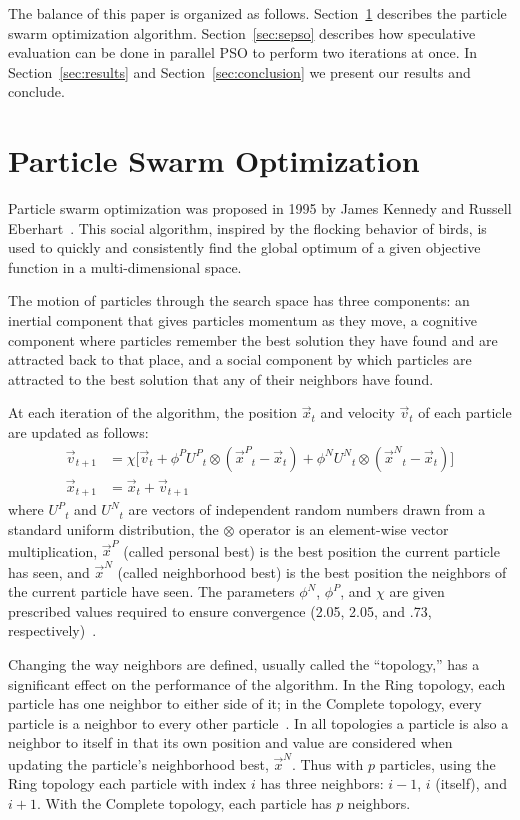 \documentclass{llncs}
\renewcommand{\sec}[1]{Section~\ref{sec:#1}}
\providecommand{\pers}{\ensuremath{P}}
\providecommand{\neigh}{\ensuremath{N}}
\providecommand{\nURand}{\ensuremath{U^\neigh}}
\providecommand{\pURand}{\ensuremath{U^\pers}}
\providecommand{\ppos}{\ensuremath{\Vec{x}}}
\providecommand{\pvel}{\ensuremath{\Vec{v}}}
\providecommand{\nbest}{\ensuremath{\Vec{x}^\neigh}}
\providecommand{\pbest}{\ensuremath{\Vec{x}^\pers}}
\providecommand{\constriction}{\ensuremath{\chi}}
\providecommand{\ncoeff}{\ensuremath{\phi^\neigh}}
\providecommand{\pcoeff}{\ensuremath{\phi^\pers}}
\begin{document}
The balance of this paper is organized as follows. \sec{pso} describes the
particle swarm optimization algorithm.  \sec{sepso} describes how speculative
evaluation can be done in parallel PSO to perform two iterations at once.  In
\sec{results} and \sec{conclusion} we present our results and conclude.

\section{Particle Swarm Optimization}
\label{sec:pso}

Particle swarm optimization was proposed in 1995 by James Kennedy and Russell
Eberhart~\cite{kennedy-1995-particle-swarm-optimization}.  This social
algorithm, inspired by the flocking behavior of birds, is used to quickly and
consistently find the global optimum of a given objective function in a
multi-dimensional space.

The motion of particles through the search space has three components: an
inertial component that gives particles momentum as they move, a cognitive
component where particles remember the best solution they have found and are
attracted back to that place, and a social component by which particles are
attracted to the best solution that any of their neighbors have found.

At each iteration of the algorithm, the position $\ppos_t$ and velocity
$\pvel_t$ of each particle are updated as follows:
\begin{align}
\label{eq:velupdate}
	\pvel_{t+1} &=
		\constriction \bigl[ \pvel_t
			+ \pcoeff\pURand_{t}\otimes(\pbest_{t} - \ppos_{t})
			+ \ncoeff\nURand_{t}\otimes(\nbest_{t} - \ppos_{t})
		\bigr] \\
\label{eq:posupdate}
	\ppos_{t+1} &= \ppos_{t} + \pvel_{t+1}
\end{align}
where \( \pURand_{t} \) and \( \nURand_{t} \) are vectors of independent random
numbers drawn from a standard uniform distribution, the \( \otimes \) operator
is an element-wise vector multiplication, $\pbest$ (called personal best) is
the best position the current particle has seen, and $\nbest$ (called
neighborhood best) is the best position the neighbors of the current particle
have seen.  The parameters \( \ncoeff \), \( \pcoeff \), and \( \constriction
\) are given prescribed values required to ensure convergence (2.05, 2.05, and
.73, respectively)~\cite{clerc-2002-constricted-pso}. 

Changing the way neighbors are defined, usually called the ``topology,''
has a significant effect on the performance of the algorithm.  In
the Ring topology, each particle has one neighbor to either side of it; in the
Complete topology, every particle is a neighbor to every other
particle~\cite{bratton-2007-defining-a-standard-for-pso}.  In all topologies a
particle is also a neighbor to itself in that its own position and value are
considered when updating the particle's neighborhood best, $\nbest$.  Thus with
$p$ particles, using the Ring topology each particle with index $i$ has three
neighbors: $i-1$, $i$ (itself), and $i+1$.  With the Complete topology, each
particle has $p$ neighbors.
\end{document}
